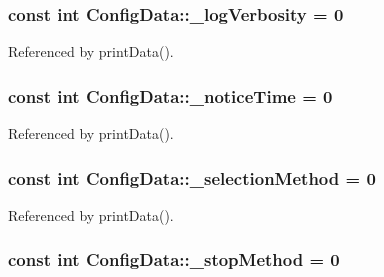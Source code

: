 \subsubsection[{\texorpdfstring{\+\_\+log\+Verbosity}{_logVerbosity}}]{\setlength{\rightskip}{0pt plus 5cm}const int Config\+Data\+::\+\_\+log\+Verbosity = 0\hspace{0.3cm}{\ttfamily [private]}}\hypertarget{classConfigData_aa8483944273e9eaa13dff184a8079633}{}\label{classConfigData_aa8483944273e9eaa13dff184a8079633}


Referenced by print\+Data().

\subsubsection[{\texorpdfstring{\+\_\+notice\+Time}{_noticeTime}}]{\setlength{\rightskip}{0pt plus 5cm}const int Config\+Data\+::\+\_\+notice\+Time = 0\hspace{0.3cm}{\ttfamily [private]}}\hypertarget{classConfigData_a1b82ac5b308abfd0e5a8e4eccec72076}{}\label{classConfigData_a1b82ac5b308abfd0e5a8e4eccec72076}


Referenced by print\+Data().

\subsubsection[{\texorpdfstring{\+\_\+selection\+Method}{_selectionMethod}}]{\setlength{\rightskip}{0pt plus 5cm}const int Config\+Data\+::\+\_\+selection\+Method = 0\hspace{0.3cm}{\ttfamily [private]}}\hypertarget{classConfigData_a348ab0349d09526606e839a639881172}{}\label{classConfigData_a348ab0349d09526606e839a639881172}


Referenced by print\+Data().

\subsubsection[{\texorpdfstring{\+\_\+stop\+Method}{_stopMethod}}]{\setlength{\rightskip}{0pt plus 5cm}const int Config\+Data\+::\+\_\+stop\+Method = 0\hspace{0.3cm}{\ttfamily [private]}}\hypertarget{classConfigData_a0f6db7bbe04644529713729e929b67c0}{}\label{classConfigData_a0f6db7bbe04644529713729e929b67c0}


